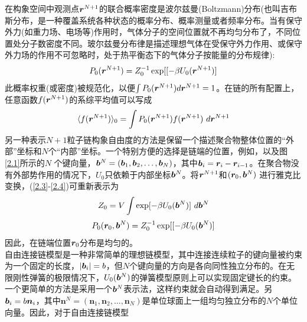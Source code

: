 在构象空间中观测点$\bm{r}^{N+1}$的联合概率密度是波尔兹曼(Boltzmann)分布(也叫吉布斯分布，是一种覆盖系统各种状态的概率分布、概率测量或者频率分布。当有保守外力(如重力场、电场等)作用时，气体分子的空间位置就不再均匀分布了，不同位置处分子数密度不同。玻尔兹曼分布律是描述理想气体在受保守外力作用、或保守外力场的作用不可忽略时，处于热平衡态下的气体分子按能量的分布规律):\\
\begin{equation}
P_0(\bm{r}^{N+1})=Z_{0}^{-1} \exp[[-\beta U_{0}(\bm{r}^{N+1})]
\label{2.4}
\end{equation}
此概率权重(或密度)被规范化，以便$\int P_0(\bm{r}^{N+1}) d\bm{r}^{N+1}=1$。在链的所有配置上，任意函数$f(\bm{r}^{N+1})$的系综平均值可以写成\\
\begin{equation}
\langle f(\bm{r}^{N+1})\rangle _0 =  \int P_0(\bm{r}^{N+1})f(\bm{r}^{N+1})~d\bm{r}^{N+1}
\label{2.5}
\end{equation}
另一种表示$N+1$粒子链构象自由度的方法是保留一个描述聚合物整体位置的“外部”坐标和$N$个“内部”坐标。一个特别方便的选择是链端的位置，例如，以及图\ref{2.1}所示的$N$ 个键向量，$\bm{b}^{N}=(\bm{b}_1,\bm{b}_2,\ldots,\bm{b}_{N})$，其中$\bm{b}_{i}=\bm{r}_{i}-\bm{r}_{i-1}$。在聚合物没有外部势作用的情况下，$U_0$只依赖于内部坐标$\bm{b}^{N}$。将$\bm{r}^{N+1}$和$(\bm{r}_0,\bm{b}^{N})$ 进行雅克比变换，(\ref{2.3}-\ref{2.4})可重新表示为\\


\begin{equation}
Z_0 = V \int \exp[-\beta U_{0}(\bm{b}^{N})]~d\bm{b}^{N}
\label{2.6}
\end{equation}
\begin{equation}
P_0(\bm{r}_0,\bm{b}^{N})=Z_{0}^{-1} \exp[[-\beta U_{0}(\bm{b}^{N})]
\label{2.7}
\end{equation}
因此，在链端位置$\bm{r}_0$分布是均匀的。\\

自由连接链模型是一种非常简单的理想链模型，其中连接连续粒子的键向量被约束为一个固定的长度，$|\bm{b}_{i}|=b$，但$N$个键向量的方向是各向同性独立分布的。在无限刚性弹簧的极限情况下，$U_0(\bm{b}^{N})$的弹簧模型原则上可以实现固定键长的约束。一个更简单的方法是采用一个$\bm{b}^{N}$表示法，这样约束就会自动得到满足。另
$\bm{b}_{i}=b\bm{n}_{i}$，其中$\bm{n}^{N}=(\bm{n}_1,\bm{n}_2,\ldots,\bm{n}_{N})$是单位球面上一组均匀独立分布的$N$个单位向量。因此，对于自由连接链模型\\

